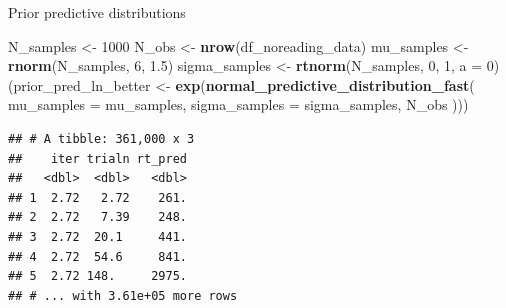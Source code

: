 \documentclass[12pt,ignorenonframetext,aspectratio=169]{beamer}
\newenvironment{Shaded}{\begin{snugshade}}{\end{snugshade}}
\newcommand{\DataTypeTok}[1]{\textcolor[rgb]{0.13,0.29,0.53}{#1}}
\newcommand{\DecValTok}[1]{\textcolor[rgb]{0.00,0.00,0.81}{#1}}
\newcommand{\FloatTok}[1]{\textcolor[rgb]{0.00,0.00,0.81}{#1}}
\newcommand{\KeywordTok}[1]{\textcolor[rgb]{0.13,0.29,0.53}{\textbf{#1}}}
\newcommand{\NormalTok}[1]{#1}
\newcommand{\StringTok}[1]{\textcolor[rgb]{0.31,0.60,0.02}{#1}}
\begin{document}
\begin{frame}[fragile]{Prior predictive distributions}
\protect\hypertarget{prior-predictive-distributions-2}{}

\scriptsize

\begin{Shaded}
\begin{Highlighting}[]
\NormalTok{N_samples <-}\StringTok{ }\DecValTok{1000}
\NormalTok{N_obs <-}\StringTok{ }\KeywordTok{nrow}\NormalTok{(df_noreading_data)}
\NormalTok{mu_samples <-}\StringTok{ }\KeywordTok{rnorm}\NormalTok{(N_samples, }\DecValTok{6}\NormalTok{, }\FloatTok{1.5}\NormalTok{)}
\NormalTok{sigma_samples <-}\StringTok{ }\KeywordTok{rtnorm}\NormalTok{(N_samples, }\DecValTok{0}\NormalTok{, }\DecValTok{1}\NormalTok{, }\DataTypeTok{a =} \DecValTok{0}\NormalTok{)}
\NormalTok{(prior_pred_ln_better <-}\StringTok{ }\KeywordTok{exp}\NormalTok{(}\KeywordTok{normal_predictive_distribution_fast}\NormalTok{(}
  \DataTypeTok{mu_samples =}\NormalTok{ mu_samples,}
  \DataTypeTok{sigma_samples =}\NormalTok{ sigma_samples,}
\NormalTok{  N_obs}
\NormalTok{)))}
\end{Highlighting}
\end{Shaded}

\begin{verbatim}
## # A tibble: 361,000 x 3
##    iter trialn rt_pred
##   <dbl>  <dbl>   <dbl>
## 1  2.72   2.72    261.
## 2  2.72   7.39    248.
## 3  2.72  20.1     441.
## 4  2.72  54.6     841.
## 5  2.72 148.     2975.
## # ... with 3.61e+05 more rows
\end{verbatim}

\normalsize

\end{frame}
\end{document}
